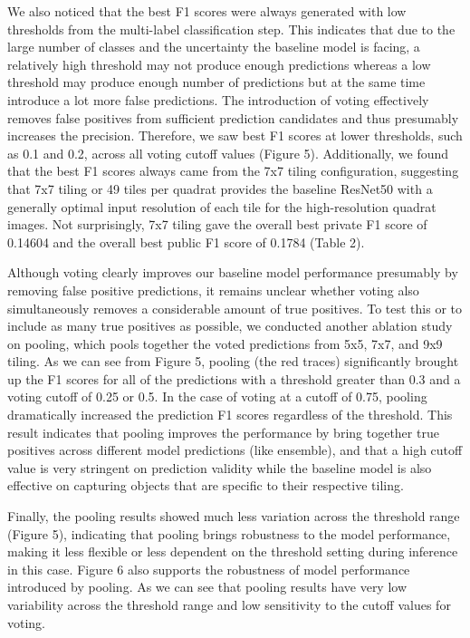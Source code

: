 \documentclass[conference]{IEEEtran}
\begin{document}
We also noticed that the best F1 scores were always generated with low thresholds from the multi-label classification step. This indicates that due to the large number of classes and the uncertainty the baseline model is facing, a relatively high threshold may not produce enough predictions whereas a low threshold may produce enough number of predictions but at the same time introduce a lot more false predictions. The introduction of voting effectively removes false positives from sufficient prediction candidates and thus presumably increases the precision. Therefore, we saw best F1 scores at lower thresholds, such as 0.1 and 0.2, across all voting cutoff values (Figure 5). Additionally, we found that the best F1 scores always came from the 7x7 tiling configuration, suggesting that 7x7 tiling or 49 tiles per quadrat provides the baseline ResNet50 with a generally optimal input resolution of each tile for the high-resolution quadrat images. Not surprisingly, 7x7 tiling gave the overall best private F1 score of 0.14604 and the overall best public F1 score of 0.1784 (Table 2).

Although voting clearly improves our baseline model performance presumably by removing false positive predictions, it remains unclear whether voting also simultaneously removes a considerable amount of true positives. To test this or to include as many true positives as possible, we conducted another ablation study on pooling, which pools together the voted predictions from 5x5, 7x7, and 9x9 tiling. As we can see from Figure 5, pooling (the red traces) significantly brought up the F1 scores for all of the predictions with a threshold greater than 0.3 and a voting cutoff of 0.25 or 0.5. In the case of voting at a cutoff of 0.75, pooling dramatically increased the prediction F1 scores regardless of the threshold. This result indicates that pooling improves the performance by bring together true positives across different model predictions (like ensemble), and that a high cutoff value is very stringent on prediction validity while the baseline model is also effective on capturing objects that are specific to their respective tiling.

Finally, the pooling results showed much less variation across the threshold range (Figure 5), indicating that pooling brings robustness to the model performance, making it less flexible or less dependent on the threshold setting during inference in this case. Figure 6 also supports the robustness of model performance introduced by pooling. As we can see that pooling results have very low variability across the threshold range and low sensitivity to the cutoff values for voting. 
\end{document}
